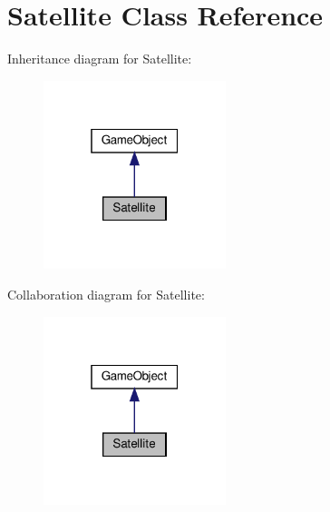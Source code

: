 \hypertarget{class_satellite}{}\section{Satellite Class Reference}
\label{class_satellite}


Inheritance diagram for Satellite\+:
\nopagebreak
\begin{figure}[H]
\begin{center}
\leavevmode
\includegraphics[width=151pt]{class_satellite__inherit__graph}
\end{center}
\end{figure}


Collaboration diagram for Satellite\+:
\nopagebreak
\begin{figure}[H]
\begin{center}
\leavevmode
\includegraphics[width=151pt]{class_satellite__coll__graph}
\end{center}
\end{figure}
